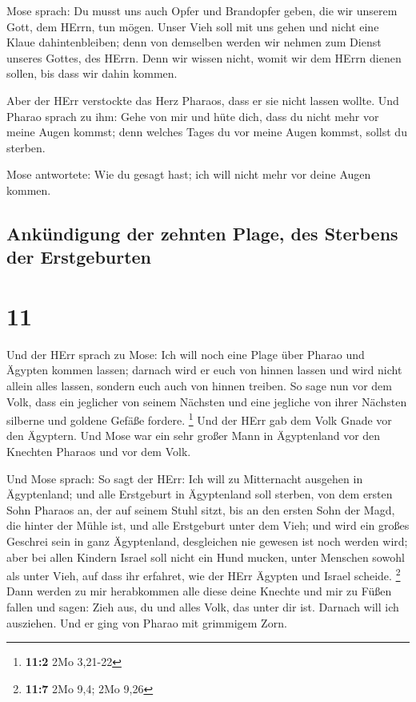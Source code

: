  Mose sprach: Du musst uns auch Opfer und Brandopfer
geben, die wir unserem Gott, dem HErrn, tun mögen.  Unser
Vieh soll mit uns gehen und nicht eine Klaue dahintenbleiben; denn von
demselben werden wir nehmen zum Dienst unseres Gottes, des HErrn. Denn
wir wissen nicht, womit wir dem HErrn dienen sollen, bis dass wir dahin
kommen.

 Aber der HErr verstockte das Herz Pharaos, dass er sie
nicht lassen wollte.  Und Pharao sprach zu ihm: Gehe von
mir und hüte dich, dass du nicht mehr vor meine Augen kommst; denn
welches Tages du vor meine Augen kommst, sollst du sterben.

 Mose antwortete: Wie du gesagt hast; ich will nicht mehr
vor deine Augen kommen.

\hypertarget{ankuxfcndigung-der-zehnten-plage-des-sterbens-der-erstgeburten}{%
\subsection{Ankündigung der zehnten Plage, des Sterbens der
Erstgeburten}\label{ankuxfcndigung-der-zehnten-plage-des-sterbens-der-erstgeburten}}

\hypertarget{section-10}{%
\section{11}\label{section-10}}

 Und der HErr sprach zu Mose: Ich will noch eine Plage
über Pharao und Ägypten kommen lassen; darnach wird er euch von hinnen
lassen und wird nicht allein alles lassen, sondern euch auch von hinnen
treiben.  So sage nun vor dem Volk, dass ein jeglicher von
seinem Nächsten und eine jegliche von ihrer Nächsten silberne und
goldene Gefäße fordere. \footnote{\textbf{11:2} 2Mo 3,21-22}
 Und der HErr gab dem Volk Gnade vor den Ägyptern. Und
Mose war ein sehr großer Mann in Ägyptenland vor den Knechten Pharaos
und vor dem Volk.

 Und Mose sprach: So sagt der HErr: Ich will zu
Mitternacht ausgehen in Ägyptenland;  und alle Erstgeburt
in Ägyptenland soll sterben, von dem ersten Sohn Pharaos an, der auf
seinem Stuhl sitzt, bis an den ersten Sohn der Magd, die hinter der
Mühle ist, und alle Erstgeburt unter dem Vieh;  und wird
ein großes Geschrei sein in ganz Ägyptenland, desgleichen nie gewesen
ist noch werden wird;  aber bei allen Kindern Israel soll
nicht ein Hund mucken, unter Menschen sowohl als unter Vieh, auf dass
ihr erfahret, wie der HErr Ägypten und Israel scheide. \footnote{\textbf{11:7}
  2Mo 9,4; 2Mo 9,26}  Dann werden zu mir herabkommen alle
diese deine Knechte und mir zu Füßen fallen und sagen: Zieh aus, du und
alles Volk, das unter dir ist. Darnach will ich ausziehen. Und er ging
von Pharao mit grimmigem Zorn.

